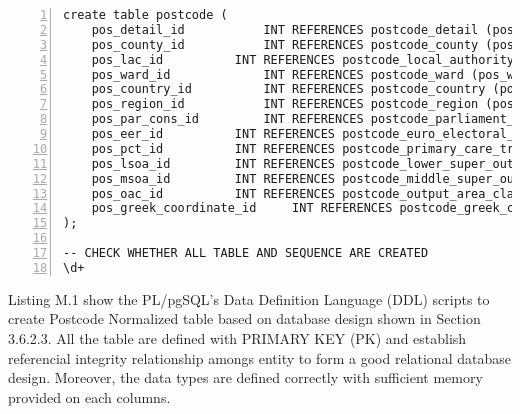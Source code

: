 \begin{lstlisting}[breaklines, frame=single, numbers=left, caption={PL/pgSQL's DDL scripts for Postcode Normalized Table Creation.}, label=commandline-02]
create table postcode ( 
	pos_detail_id 			INT REFERENCES postcode_detail (pos_detail_id), 
	pos_county_id 			INT REFERENCES postcode_county (pos_county_id),
	pos_lac_id 			INT REFERENCES postcode_local_authority_county (pos_lac_id),
	pos_ward_id 			INT REFERENCES postcode_ward (pos_ward_id), 
	pos_country_id			INT REFERENCES postcode_country (pos_country_id),
	pos_region_id 			INT REFERENCES postcode_region (pos_region_id),	
	pos_par_cons_id 		INT REFERENCES postcode_parliament_constituency (pos_par_cons_id),
	pos_eer_id 			INT REFERENCES postcode_euro_electoral_region (pos_eer_id), 
	pos_pct_id			INT REFERENCES postcode_primary_care_trust (pos_pct_id),  
	pos_lsoa_id			INT REFERENCES postcode_lower_super_output_area (pos_lsoa_id), 
	pos_msoa_id			INT REFERENCES postcode_middle_super_output_area (pos_msoa_id), 
	pos_oac_id			INT REFERENCES postcode_output_area_classification (pos_oac_id),
	pos_greek_coordinate_id		INT REFERENCES postcode_greek_coordinate (pos_greek_coordinate_id)	
);

-- CHECK WHETHER ALL TABLE AND SEQUENCE ARE CREATED 
\d+ 

\end{lstlisting}

Listing M.1 show the PL/pgSQL's Data Definition Language (DDL) scripts to create Postcode Normalized table based on database design shown in Section 3.6.2.3. All the table are defined with PRIMARY KEY (PK) and establish referencial integrity relationship amongs entity to form a good relational database design. Moreover, the data types are defined correctly with sufficient memory provided on each columns.

\pagebreak

